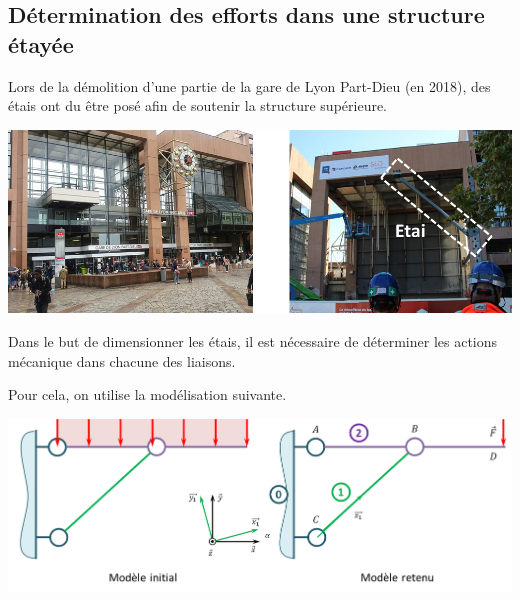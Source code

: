 \documentclass[10pt,fleqn]{article} %
\begin{document}
\begin{multicols}{2}
\begin{multicols}{2}
\footnotesize
{}
\normalsize

\ifprof
\newpage
\else
\fi

\section*{Détermination des efforts dans une structure étayée}
\setcounter{exo}{0}
\ifprof
\else
Lors de la démolition d'une partie de la gare de Lyon Part-Dieu (en 2018), des étais ont du être posé afin de soutenir la structure supérieure. 

\begin{center}
\includegraphics[width=\linewidth]{images/fig_03}
\end{center}

Dans le but de dimensionner les étais, il est nécessaire de déterminer les actions mécanique dans chacune des liaisons. 

Pour cela, on utilise la modélisation suivante. 

\begin{center}
\includegraphics[width=\linewidth]{images/fig_04}
\end{center}


\end{multicols}
\end{multicols}
\end{document}
